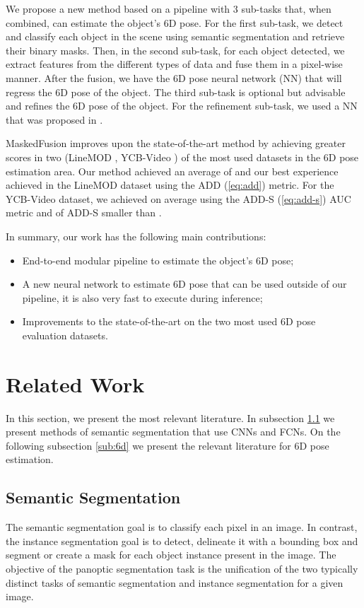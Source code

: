 \documentclass[runningheads]{llncs}
\begin{document}
We propose a new method based on a pipeline with 3 sub-tasks that, when combined, can estimate the object's 6D pose.
For the first sub-task, we detect and classify each object in the scene using semantic segmentation and retrieve their binary masks.
Then, in the second sub-task, for each object detected, we extract features from the different types of data and fuse them in a pixel-wise manner.
After the fusion, we have the 6D pose neural network (NN) that will regress the 6D pose of the object.
The third sub-task is optional but advisable and refines the 6D pose of the object.
For the refinement sub-task, we used a NN that was proposed in \cite{densefusion}.

MaskedFusion improves upon the state-of-the-art method by achieving greater scores in two (LineMOD \cite{linemod}, YCB-Video \cite{posecnn}) of the most used datasets in the 6D pose estimation area.
Our method achieved an average of  and our best experience achieved  in the LineMOD dataset using the ADD (\ref{eq:add}) metric.
For the YCB-Video dataset, we achieved on average  using the ADD-S (\ref{eq:add-s}) AUC metric and  of ADD-S smaller than .

In summary, our work has the following main contributions:
\vspace{-.7em}
\begin{itemize}
    \item End-to-end modular pipeline to estimate the object's 6D pose;
    \item A new neural network to estimate 6D pose that can be used outside of our pipeline, it is also very fast to execute during inference;
    \item Improvements to the state-of-the-art on the two most used 6D pose evaluation datasets.
\end{itemize}



\section{Related Work}
In this section, we present the most relevant literature.
In subsection \ref{sub:ss} we present methods of semantic segmentation that use CNNs and FCNs.
On the following subsection \ref{sub:6d} we present the relevant literature for 6D pose estimation.



\subsection{Semantic Segmentation}
\label{sub:ss}
The semantic segmentation goal is to classify each pixel in an image.
In contrast, the instance segmentation goal is to detect, delineate it with a bounding box and segment or create a mask for each object instance present in the image.
The objective of the panoptic segmentation task \cite{panopticsegmentation} is the unification of the two typically distinct tasks of semantic segmentation and instance segmentation for a given image.
\end{document}
